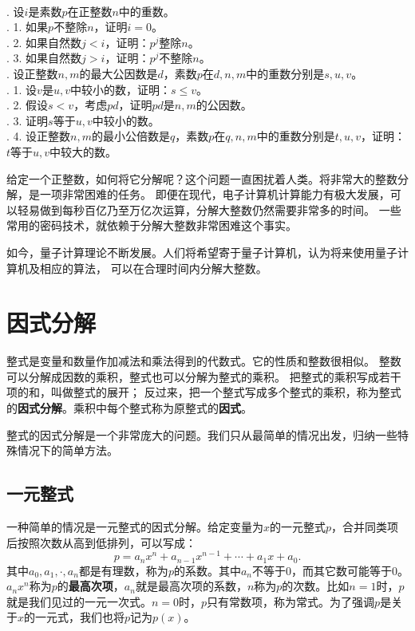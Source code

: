 \documentclass[12pt,UTF8]{ctexbook}
\begin{document}
\begin{xt}\label{xt:1-1-1}
    \mbox{}\\
    . 设$i$是素数$p$在正整数$n$中的重数。\\
    . 1. 如果$p$不整除$n$，证明$i = 0$。\\
    . 2. 如果自然数$j < i$，证明：$p^j$整除$n$。\\
    . 3. 如果自然数$j > i$，证明：$p^j$不整除$n$。\\
    . 设正整数$n,m$的最大公因数是$d$，素数$p$在$d,n,m$中的重数分别是$s,u,v$。\\
    . 1. 设$v$是$u,v$中较小的数，证明：$s \leqslant v$。\\
    . 2. 假设$s < v$，考虑$pd$，证明$pd$是$n,m$的公因数。\\
    . 3. 证明$s$等于$u,v$中较小的数。 \\
    . 4. 设正整数$n,m$的最小公倍数是$q$，素数$p$在$q,n,m$中的重数分别是$t,u,v$，证明：$t$等于$u,v$中较大的数。\\
\end{xt}

给定一个正整数，如何将它分解呢？这个问题一直困扰着人类。将非常大的整数分解，是一项非常困难的任务。
即便在现代，电子计算机计算能力有极大发展，可以轻易做到每秒百亿乃至万亿次运算，分解大整数仍然需要非常多的时间。
一些常用的密码技术，就依赖于分解大整数非常困难这个事实。

如今，量子计算理论不断发展。人们将希望寄于量子计算机，认为将来使用量子计算机及相应的算法，
可以在合理时间内分解大整数。

\chapter{因式分解}
整式是变量和数量作加减法和乘法得到的代数式。它的性质和整数很相似。
整数可以分解成因数的乘积，整式也可以分解为整式的乘积。
把整式的乘积写成若干项的和，叫做整式的展开；
反过来，把一个整式写成多个整式的乘积，称为整式的\textbf{因式分解}。乘积中每个整式称为原整式的\textbf{因式}。

整式的因式分解是一个非常庞大的问题。我们只从最简单的情况出发，归纳一些特殊情况下的简单方法。

\section{一元整式}
一种简单的情况是一元整式的因式分解。给定变量为$x$的一元整式$p$，合并同类项后按照次数从高到低排列，可以写成：
$$ p = a_nx^n + a_{n-1}x^{n-1} + \cdots + a_1 x + a_0.$$
其中$a_0, a_1, \cdot , a_n$都是有理数，称为$p$的系数。其中$a_n$不等于$0$，而其它数可能等于$0$。
$a_nx^n$称为$p$的\textbf{最高次项}，$a_n$就是最高次项的系数，$n$称为$p$的次数。比如$n=1$时，$p$
就是我们见过的一元一次式。$n=0$时，$p$只有常数项，称为常式。为了强调$p$是关于$x$的一元式，我们也将$p$记为$p(x)$。
\end{document}
